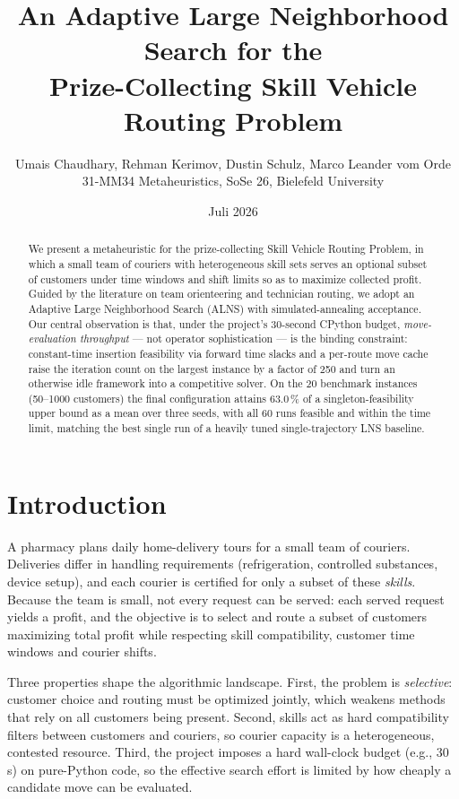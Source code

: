 \documentclass[10pt, a4paper]{article}
\title{An Adaptive Large Neighborhood Search for the\\
       Prize-Collecting Skill Vehicle Routing Problem}
\author{Umais Chaudhary, Rehman Kerimov, Dustin Schulz, Marco Leander vom Orde \\ \small 31-MM34 Metaheuristics, SoSe 26, Bielefeld University}
\date{Juli 2026}
\begin{document}
\maketitle

\begin{abstract}
We present a metaheuristic for the prize-collecting Skill Vehicle Routing
Problem, in which a small team of couriers with heterogeneous skill sets
serves an optional subset of customers under time windows and shift limits so
as to maximize collected profit. Guided by the literature on team orienteering
and technician routing, we adopt an Adaptive Large Neighborhood Search (ALNS)
with simulated-annealing acceptance. Our central observation is that, under
the project's 30-second CPython budget, \emph{move-evaluation throughput} ---
not operator sophistication --- is the binding constraint: constant-time
insertion feasibility via forward time slacks and a per-route move cache
raise the iteration count on the largest instance by a factor of 250 and turn
an otherwise idle framework into a competitive solver. On the 20 benchmark
instances (50--1000 customers) the final configuration attains 63.0\,\% of a
singleton-feasibility upper bound as a mean over three seeds, with all 60
runs feasible and within the time limit, matching the best single run of a
heavily tuned single-trajectory LNS baseline.
\end{abstract}

\section{Introduction}

A pharmacy plans daily home-delivery tours for a small team of couriers.
Deliveries differ in handling requirements (refrigeration, controlled
substances, device setup), and each courier is certified for only a subset of
these \emph{skills}. Because the team is small, not every request can be
served: each served request yields a profit, and the objective is to select
and route a subset of customers maximizing total profit while respecting
skill compatibility, customer time windows and courier shifts.

Three properties shape the algorithmic landscape. First, the problem is
\emph{selective}: customer choice and routing must be optimized jointly, which
weakens methods that rely on all customers being present. Second, skills act
as hard compatibility filters between customers and couriers, so courier
capacity is a heterogeneous, contested resource. Third, the project imposes a
hard wall-clock budget (e.g., 30\,s) on pure-Python code, so the effective
search effort is limited by how cheaply a candidate move can be evaluated.
\end{document}
